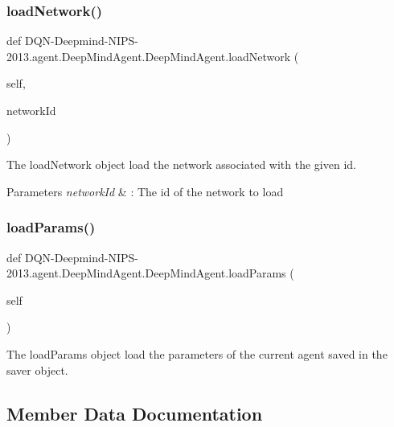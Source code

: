 \subsubsection{\texorpdfstring{load\+Network()}{loadNetwork()}}
{\footnotesize\ttfamily def D\+QN-\/Deepmind-\/N\+I\+PS-\/2013.agent.\+Deep\+Mind\+Agent.\+Deep\+Mind\+Agent.\+load\+Network (\begin{DoxyParamCaption}\item[{}]{self,  }\item[{}]{network\+Id }\end{DoxyParamCaption})}



The load\+Network object load the network associated with the given id. 


\begin{DoxyParams}{Parameters}
{\em network\+Id} & \+: The id of the network to load \\
\hline
\end{DoxyParams}
\hypertarget{classDQN-Deepmind-NIPS-2013_1_1agent_1_1DeepMindAgent_1_1DeepMindAgent_ae3b30ec9438fbaa91c440415e43844fe}{}\label{classDQN-Deepmind-NIPS-2013_1_1agent_1_1DeepMindAgent_1_1DeepMindAgent_ae3b30ec9438fbaa91c440415e43844fe} 
\subsubsection{\texorpdfstring{load\+Params()}{loadParams()}}
{\footnotesize\ttfamily def D\+QN-\/Deepmind-\/N\+I\+PS-\/2013.agent.\+Deep\+Mind\+Agent.\+Deep\+Mind\+Agent.\+load\+Params (\begin{DoxyParamCaption}\item[{}]{self }\end{DoxyParamCaption})}



The load\+Params object load the parameters of the current agent saved in the saver object. 



\subsection{Member Data Documentation}
\hypertarget{classDQN-Deepmind-NIPS-2013_1_1agent_1_1DeepMindAgent_1_1DeepMindAgent_a63e93b51f5b355b0896957d4484a8fb3}{}\label{classDQN-Deepmind-NIPS-2013_1_1agent_1_1DeepMindAgent_1_1DeepMindAgent_a63e93b51f5b355b0896957d4484a8fb3} 
